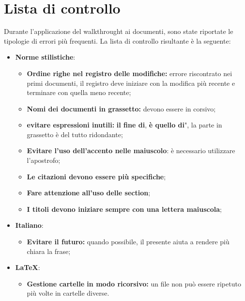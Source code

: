 \chapter{Lista di controllo}
\label{ListaControllo}
Durante l'applicazione del walkthrought ai documenti, sono state riportate le tipologie di errori più frequenti. La lista di controllo risultante è la seguente:
\begin{itemize}
	\item \textbf{Norme stilistiche}:
	\begin{itemize}
		\item \textbf{Ordine righe nel registro delle modifiche:} errore riscontrato nei primi documenti, il registro deve iniziare con la modifica più recente e terminare con quella meno recente;
		\item \textbf{Nomi dei documenti in grassetto:} devono essere in corsivo;
		\item \textbf{evitare espressioni inutili:} \textbf{il fine di}, \textbf{è quello di}", la parte in grassetto è del tutto ridondante;
		\item \textbf{Evitare l'uso dell'accento nelle maiuscolo}: è necessario utilizzare l'apostrofo;
		\item \textbf{Le citazioni devono essere più specifiche};
		\item \textbf{Fare attenzione all'uso delle section};
		\item \textbf{I titoli devono iniziare sempre con una lettera maiuscola};
	\end{itemize}
	\item \textbf{Italiano}:
	\begin{itemize}
		\item \textbf{Evitare il futuro:} quando possibile, il presente aiuta a rendere più chiara la frase;
	\end{itemize}
	\item \textbf{\LaTeX}:
	\begin{itemize}
		\item \textbf{Gestione cartelle in modo ricorsivo:} un file non può essere ripetuto più volte in cartelle diverse.
	\end{itemize}
\end{itemize}